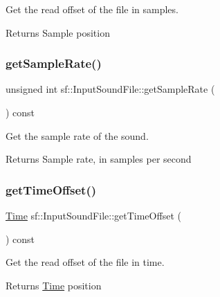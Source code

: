 Get the read offset of the file in samples. 

\begin{DoxyReturn}{Returns}
Sample position \begin{DoxyVerb}\end{DoxyVerb}
 
\end{DoxyReturn}
\mbox{\label{classsf_1_1_input_sound_file_a6b8177e40dd8020752f6d52f96b774c3}} 
\subsubsection{\texorpdfstring{getSampleRate()}{getSampleRate()}}
{\footnotesize\ttfamily unsigned int sf\+::\+Input\+Sound\+File\+::get\+Sample\+Rate (\begin{DoxyParamCaption}{ }\end{DoxyParamCaption}) const}



Get the sample rate of the sound. 

\begin{DoxyReturn}{Returns}
Sample rate, in samples per second \begin{DoxyVerb}\end{DoxyVerb}
 
\end{DoxyReturn}
\mbox{\label{classsf_1_1_input_sound_file_ad1a2238acb734d8b1144ecd75cccc2e7}} 
\subsubsection{\texorpdfstring{getTimeOffset()}{getTimeOffset()}}
{\footnotesize\ttfamily \mbox{\hyperlink{classsf_1_1_time}{Time}} sf\+::\+Input\+Sound\+File\+::get\+Time\+Offset (\begin{DoxyParamCaption}{ }\end{DoxyParamCaption}) const}



Get the read offset of the file in time. 

\begin{DoxyReturn}{Returns}
\mbox{\hyperlink{classsf_1_1_time}{Time}} position \begin{DoxyVerb}\end{DoxyVerb}
 
\end{DoxyReturn}
\mbox{\label{classsf_1_1_input_sound_file_af68e54bc9bfac19554c84601156fe93f}} 
